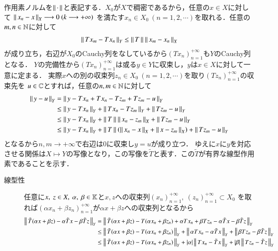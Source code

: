 \begin{prf}
		作用素ノルムを$\left\|\, \cdot\, \right\|_{}$と表記する．$X_0$が$X$で稠密であるから，任意の$x \in X$に対して
		$\left\|\, x_n - x\, \right\|_{X} \longrightarrow 0\ (k \longrightarrow +\infty)$
		を満たす$x_n \in X_0 \ (n=1,2,\cdots)$を取れる．任意の$m,n \in \mathbb{N}$に対して
		\begin{align}
			\left\|\, Tx_m - Tx_n\, \right\|_{Y} \leq \left\|\, T\, \right\|_{} \left\|\, x_m - x_n\, \right\|_{X}
		\end{align}
		が成り立ち，右辺が$X_0$のCauchy列をなしているから$(Tx_n)_{n=1}^{+\infty}$も$Y$のCauchy列となる．
		$Y$の完備性から$(Tx_n)_{n=1}^{+\infty}$は或る$y \in Y$に収束し，$y$は$x \in X$に対して一意に定まる．
		実際$x$への別の収束列$z_n \in X_0 \ (n=1,2,\cdots)$を取り$(Tz_n)_{n=1}^{+\infty}$の収束先を
		$u \in \mathbb{C}$とすれば，任意の$n,m \in \mathbb{N}$に対して
		\begin{align}
			\left\|\, y - u\, \right\|_{Y} &= \left\|\, y - Tx_n + Tx_n - Tz_m + Tz_m - u\, \right\|_{Y} \\
			&\leq \left\|\, y - Tx_n\, \right\|_{Y} + \left\|\, Tx_n - Tz_m\, \right\|_{Y} + \left\|\, Tz_m - u\, \right\|_{Y} \\
			&\leq \left\|\, y - Tx_n\, \right\|_{Y} + \left\|\, T\, \right\|_{}\left\|\, x_n - z_m\, \right\|_{X} + \left\|\, Tz_m - u\, \right\|_{Y} \\
			&\leq \left\|\, y - Tx_n\, \right\|_{Y} + \left\|\, T\, \right\|_{}\left(\left\|\, x_n - x\, \right\|_{X} + \left\|\, x - z_m\, \right\|_{X}\right)+ \left\|\, Tz_m - u\, \right\|_{Y}
		\end{align}
		となるから$n,m \longrightarrow +\infty$で右辺は0に収束し$y = u$が成り立つ．
		ゆえに$x$に$y$を対応させる関係は$X \longmapsto Y$の写像となり，この写像を$\tilde{T}$と表す．この$\tilde{T}$が有界な線型作用素であることを示す．
		\begin{description}
			\item[線型性]
				任意に$x,\ z \in X,\ \alpha,\ \beta \in \mathbb{K}$と$x,z$への収束列$(x_n)_{n=1}^{+\infty},\ (z_n)_{n=1}^{+\infty} \subset X_0$
				を取れば$(\alpha x_n + \beta z_n)_{n=1}^{+\infty}$が$\alpha x+ \beta z$への収束列となるから
				\begin{align}
					\Norm{\tilde{T}(\alpha x + \beta z) - \alpha \tilde{T}x - \beta \tilde{T}z}{Y}
					&= \Norm{\tilde{T}(\alpha x + \beta z) - T(\alpha x_n + \beta z_n) + \alpha Tx_n + \beta Tz_n - \alpha \tilde{T}x - \beta \tilde{T}z}{Y} \\
					&\leq \Norm{\tilde{T}(\alpha x + \beta z) - T(\alpha x_n + \beta z_n)}{Y}
						+ \Norm{\alpha Tx_n - \alpha \tilde{T}x}{Y} + \Norm{\beta Tz_n - \beta \tilde{T}z}{Y} \\
					&\leq \Norm{\tilde{T}(\alpha x + \beta z) - T(\alpha x_n + \beta z_n)}{Y}
						+ |\alpha| \Norm{Tx_n - \tilde{T}x}{Y} + |\beta| \Norm{Tz_n - \tilde{T}z}{Y} \\

\end{align}
\end{description}
\end{prf}
